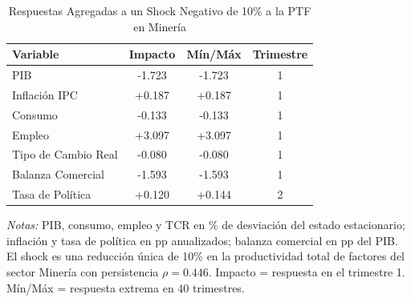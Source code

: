 \begin{table}[htbp]
\centering
\caption{Respuestas Agregadas a un Shock Negativo de 10\% a la PTF en Minería}
\label{tab:min_agg}
\begin{threeparttable}
\begin{tabular}{@{}l c c c@{}}
\toprule
Variable & Impacto & Mín/Máx & Trimestre \\
\midrule
PIB & -1.723 & -1.723 & 1 \\
Inflación IPC & +0.187 & +0.187 & 1 \\
Consumo & -0.133 & -0.133 & 1 \\
Empleo & +3.097 & +3.097 & 1 \\
Tipo de Cambio Real & -0.080 & -0.080 & 1 \\
Balanza Comercial & -1.593 & -1.593 & 1 \\
Tasa de Política & +0.120 & +0.144 & 2 \\
\bottomrule
\end{tabular}
\begin{tablenotes}[flushleft]
\footnotesize
\item \textit{Notas:} PIB, consumo, empleo y TCR en \% de desviación del estado estacionario; inflación y tasa de política en pp anualizados; balanza comercial en pp del PIB. El shock es una reducción única de 10\% en la productividad total de factores del sector Minería con persistencia $\rho = 0.446$. Impacto = respuesta en el trimestre 1. Mín/Máx = respuesta extrema en 40 trimestres.
\end{tablenotes}
\end{threeparttable}
\end{table}
